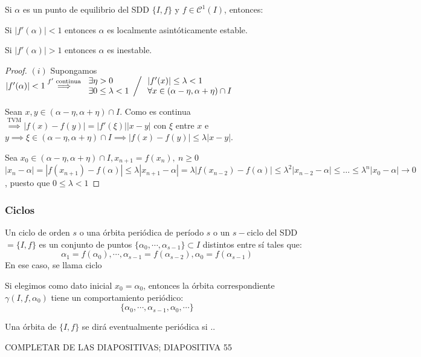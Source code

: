\begin{nth}
	Si $\alpha$ es un punto de equilibrio del SDD $\{I,f\}$ y $f \in \mathcal{C}^1(I)$, entonces:
\begin{nlist}
 \item Si $|f'(\alpha)| < 1$ entonces $\alpha$ es localmente asintóticamente estable.
 \item Si $|f'(\alpha)| > 1$ entonces $\alpha$ es inestable.
\end{nlist}
\end{nth}
\begin{proof}
	$(i)$ Supongamos $|f'(\alpha)| < 1 \stackrel{f' \text{ continua}}{\implies} \left.\begin{array}{l}
		\exists \eta > 0 \\
		\exists 0 \leq \lambda < 1
	\end{array}\right/\begin{array}{l}
		|f'(x)| \leq \lambda < 1\\
		\forall x \in (\alpha-\eta,\alpha+\eta)\cap I
\end{array}$

Sean $x,y \in (\alpha-\eta,\alpha+\eta)\cap I$. Como es continua $\stackrel{\text{TVM}}{\implies} |f(x)-f(y)| = |f'(\xi)||x-y|$ con $\xi$ entre $x$ e $y \implies \xi \in (\alpha-\eta,\alpha+\eta)\cap I \implies |f(x)-f(y)| \leq \lambda |x-y|$.

Sea $x_0 \in (\alpha-\eta,\alpha+\eta)\cap I, x_{n+1} = f(x_n),\ n \geq 0$
$|x_n-\alpha| = |f(x_{n+1})-f(\alpha)| \leq \lambda|x_{n+1}-\alpha|=\lambda|f(x_{n-2})-f(\alpha)| \leq \lambda^2|x_{n-2}-\alpha| \leq \dots \leq \lambda^n|x_0-\alpha|\rightarrow0$, puesto que $0 \leq \lambda < 1$
\end{proof}

\subsubsection{Ciclos}
\begin{ndef}[Ciclo]
	Un ciclo de orden $s$ o una órbita periódica de período $s$ o un $s-$ciclo del SDD$=\{I,f\}$ es un conjunto de puntos $\{\alpha_0, \cdots, \alpha_{s-1}\}\subset I$ distintos entre sí tales que:
	\[
	\alpha_1 = f(\alpha_0), \cdots, \alpha_{s-1}= f(\alpha_{s-2}), \alpha_0 = f(\alpha_{s-1})
	\]
	En ese caso, se llama ciclo
\end{ndef}
\begin{nota}
	Si elegimos como dato inicial $x_0 = \alpha_0$, entonces la órbita correspondiente $\gamma(I,f,\alpha_0)$ tiene un comportamiento periódico:
	\[
	\{\alpha_0,\cdots,\alpha_{s-1},\alpha_0,\cdots\}
	\]
\end{nota}
\begin{nota}
	Una órbita de $\{I,f\}$ se dirá eventualmente periódica si ..

	COMPLETAR DE LAS DIAPOSITIVAS; DIAPOSITIVA 55
\end{nota}

